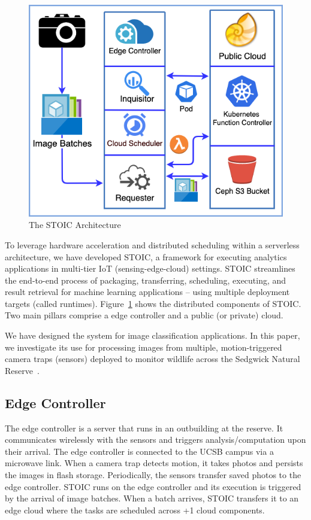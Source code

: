 \begin{figure}
    \centering
    \includegraphics[scale=0.4]{figures/STOIC.png}
    \caption{The STOIC Architecture \label{fig:STOIC}}
\end{figure}

To leverage hardware acceleration and distributed scheduling within a serverless architecture, we have developed STOIC, a framework for executing analytics applications in multi-tier IoT (sensing-edge-cloud) settings. STOIC streamlines the end-to-end process of packaging, transferring, scheduling, executing, and result retrieval for machine learning applications -- using multiple deployment targets (called runtimes). Figure~\ref{fig:STOIC} shows the distributed components of STOIC. Two main pillars comprise a edge controller and a public (or private) cloud.

We have designed the system for image classification applications. In this paper, we investigate its use for processing images from multiple, motion-triggered camera traps (sensors) deployed to monitor wildlife across the Sedgwick Natural Reserve~\cite{ref:sedgwick}.

\subsection{Edge Controller}
The edge controller is a server that runs in an outbuilding at the reserve. It communicates wirelessly with the sensors and triggers analysis/computation upon their arrival. The edge controller is connected to the UCSB campus via a microwave link. When a camera trap detects motion, it takes photos and persists the images in flash storage. Periodically, the sensors transfer saved photos to the edge controller. STOIC runs on the edge controller and its execution is triggered by the arrival of image batches. When a batch arrives, STOIC transfers it to an edge cloud where the tasks are scheduled across +1 cloud components.

